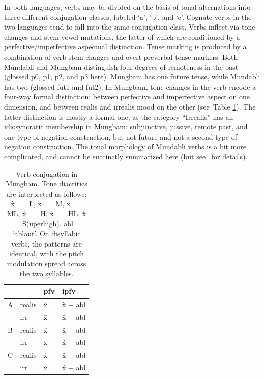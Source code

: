 \documentclass[10pt,twoside]{article}
\def\ci#1{{\ipaFont #1}}
\newcommand{\gl}[1]{`#1'}
\newcommand{\tref}[1]{Table \ref{#1}}
\def\ML#1{#1\symbol{"1DC6}} %
\def\Hline{\hline}
\begin{document}
In both languages, verbs may be divided
on the basis of tonal alternations
into three different conjugation classes,
labeled \gl{{a}}, \gl{{b}}, and \gl{{c}}.
Cognate verbs in the two languages tend
to fall into the same conjugation class.
Verbs inflect
via tone changes and stem vowel mutations,
the latter of which are conditioned by
a perfective/imperfective aspectual distinction.
Tense marking is produced by a combination of
verb stem changes and overt preverbal tense markers.
Both Mundabli and Mungbam distinguish
four degrees of remoteness in the past (glossed
{\sc p0}, {\sc p1}, {\sc p2}, and {\sc p3} here). Mungbam has one
future tense, while Mundabli has two (glossed {\sc fut1} and {\sc fut2}).
In Mungbam, tone changes in the verb encode a four-way
formal distinction: between perfective and imperfective
aspect on one dimension, and between 
realis and irrealis mood on the other (see~\tref{tblConjugation}).
The latter distinction is mostly a formal one, as the
category ``Irrealis'' has an idiosyncratic membership
 in Mungbam: subjunctive, jussive,
remote past, and one type of negation construction, but
not future and not a second type of negation construction. 
The tonal morphology of Mundabli verbs is a bit
more complicated, and cannot be succinctly summarized
here (but see~\cite{voll:verbs} for details).
%
\begin{table}[h!]
\centering
\begin{tabular}{l|lll}
\Hline
        &                       &       {\sc pfv}       &       {\sc ipfv}      \\
\hline
A       &       {\sc realis}    &       \ci{\`x}             &       \ci{\`x} $+$ {\sc abl}       \\
        &       {\sc irr}       &       \ci{\={x}}           &       \ci{\={x}} $+$ {\sc abl}     \\
\hline
B       &       {\sc realis}    &       \ci{\H{x}}           &       \ci{\^x} $+$ {\sc abl}       \\
        &       {\sc irr}       &       \ci{\ML{x}}          &       \ci{\'{x}} $+$ {\sc abl}     \\
\hline
C       &       {\sc realis}    &       \ci{\^x}             &       \ci{\^x} $+$ {\sc abl}       \\
        &       {\sc irr}       &       \ci{\'{x}}           &       \ci{\'{x}} $+$ {\sc abl}     \\
\Hline
\end{tabular}
\caption{Verb conjugation in Mungbam. Tone diacritics are interpreted as
follows: \ci{\`x} $=$ L, \ci{\={x}} $=$ M, \ci{\ML{x}} $=$ ML, \ci{\'{x}} $=$ H, \ci{\^{x}} $=$ HL,
\ci{\H{x}} $=$ S(uperhigh). {\sc abl}$=$ `ablaut'.
On disyllabic verbs, the patterns are identical, with the pitch modulation
spread across the two syllables.}
\label{tblConjugation}
\end{table}
%
\end{document}
